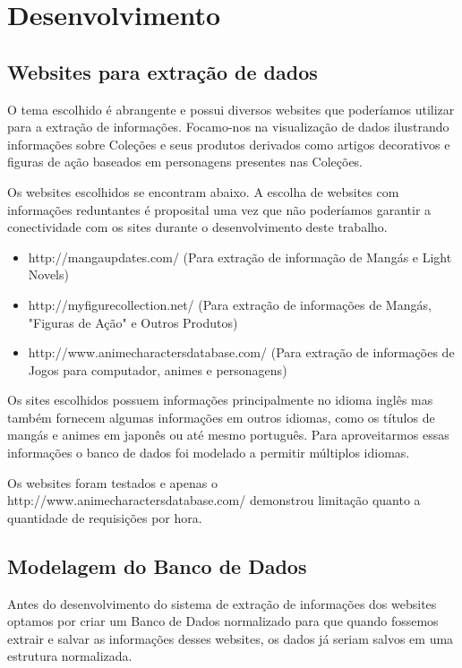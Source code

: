 \documentclass[12pt]{article}
\begin{document}
\section{Desenvolvimento}

\subsection{Websites para extração de dados}

O tema escolhido é abrangente e possui diversos websites que poderíamos utilizar para a extração de informações. Focamo-nos na visualização de dados ilustrando informações sobre Coleções e seus produtos derivados como artigos decorativos e figuras de ação baseados em personagens presentes nas Coleções. 

Os websites escolhidos se encontram abaixo. A escolha de websites com informações reduntantes é proposital uma vez que não poderíamos garantir a conectividade com os sites durante o desenvolvimento deste trabalho. 

\begin{itemize}
\item http://mangaupdates.com/ (Para extração de informação de Mangás e Light Novels)
\item http://myfigurecollection.net/ (Para extração de informações de Mangás, "Figuras de Ação" e Outros Produtos)
\item http://www.animecharactersdatabase.com/ (Para extração de informações de Jogos para computador, animes e personagens)
\end{itemize}

Os sites escolhidos possuem informações principalmente no idioma inglês mas também fornecem algumas informações em outros idiomas, como os títulos de mangás e animes em japonês ou até mesmo português. Para aproveitarmos essas informações o banco de dados foi modelado a permitir múltiplos idiomas. 

Os websites foram testados e apenas o http://www.animecharactersdatabase.com/ demonstrou limitação quanto a quantidade de requisições por hora.

\subsection{Modelagem do Banco de Dados}

Antes do desenvolvimento do sistema de extração de informações dos websites optamos por criar um Banco de Dados normalizado para que quando fossemos extrair e salvar as informações desses websites, os dados já seriam salvos em uma estrutura normalizada.
\end{document}
